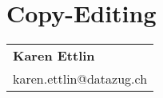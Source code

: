 \section*{Copy-Editing}

\begin{tabular}[width=0.48\textwidth]{@{}l}
\textbf{Karen Ettlin} \\
karen.ettlin@datazug.ch \\
\end{tabular}



